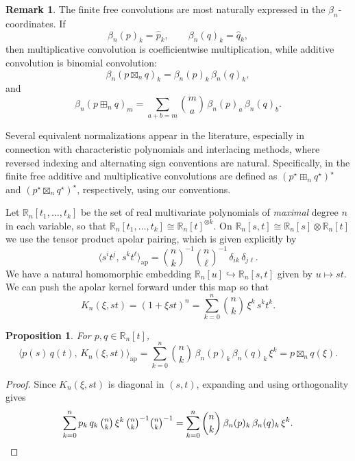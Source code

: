\documentclass[11pt]{amsart}
\newtheorem{prop}[thm]{Proposition}
\theoremstyle{definition}
\newtheorem{remark}[thm]{Remark}
\newcommand{\R}{\mathbb{R}}
\newcommand{\ip}[2]{\langle #1,\, #2 \rangle}
\newcommand{\bn}[2]{{\textstyle\binom{#1}{#2}}}
\begin{document}
\begin{remark}
The finite free convolutions are most naturally expressed in the
$\beta_n$-coordinates.  If
\[
  \beta_n(p)_k = \hat p_k,
  \qquad
  \beta_n(q)_k = \hat q_k,
\]
then multiplicative convolution is coefficientwise multiplication,
while additive convolution is binomial convolution:
\[
  \beta_n(p\boxtimes_n q)_k
  =
  \beta_n(p)_k\,\beta_n(q)_k,
\]
and
\[
  \beta_n(p\boxplus_n q)_m
  =
  \sum_{a+b=m}
  \bn{m}{a}\,
  \beta_n(p)_a\,\beta_n(q)_b.
\]

Several equivalent normalizations appear in the literature, especially in connection with characteristic polynomials and interlacing methods, where reversed indexing and alternating sign conventions are natural. Specifically, in \cite[Definitions 1.1 and 1.4]{MSS22} the finite free additive and multiplicative convolutions are defined as $(p^\star \boxplus_n q^\star)^\star$ and $(p^\star\boxtimes_n q^\star)^\star$, respectively, using our conventions.
\end{remark}



Let $\mathbb R_n[t_1,\dotsc,t_k]$ be the set of real multivariate polynomials of \emph{maximal} degree $n$ in each variable, so that $\mathbb R_n[t_1,\dotsc,t_k]\cong \mathbb R_n[t]^{\otimes k}$.
On $\mathbb R_n[s,t] \cong \R_n[s]\otimes\R_n[t]$ we use the tensor product apolar pairing,
which is given explicitly by
\[
  \ip{s^i t^j}{s^k t^\ell}_{\mathrm{ap}}
  = \bn{n}{k}^{-1}\bn{n}{\ell}^{-1}\,\delta_{ik}\,\delta_{j\ell}.
\]
We have a natural homomorphic embedding $\mathbb R_n[u]\hookrightarrow \mathbb R_n[s,t]$ given by $u\mapsto st$. We can push the apolar kernel forward under this map so that
\[
  K_n(\xi,st) = (1+\xi st)^n
  = \sum_{k=0}^n \bn{n}{k}\,\xi^k\, s^k t^k.
\]

\begin{prop}\label{prop:mult-conv-kernel}
For $p,q\in\R_n[t]$,
\[
  \ip{p(s)\,q(t)}{K_n(\xi,st)}_{\mathrm{ap}}
  = \sum_{k=0}^n \bn{n}{k}\,
  \beta_n(p)_k\,\beta_n(q)_k\,\xi^k = p\boxtimes_n q(\xi).
\]
\end{prop}

\begin{proof}
Since $K_n(\xi,st)$ is diagonal in $(s,t)$, expanding and
using orthogonality gives
\[
  \sum_{k=0}^n p_k\, q_k\, \bn{n}{k}\,\xi^k\,
  \bn{n}{k}^{-1}\bn{n}{k}^{-1}
  = \sum_{k=0}^n \binom{n}{k}\,
  \beta_n(p)_k\,\beta_n(q)_k\,\xi^k. \qedhere
\]
\end{proof}
\end{document}
